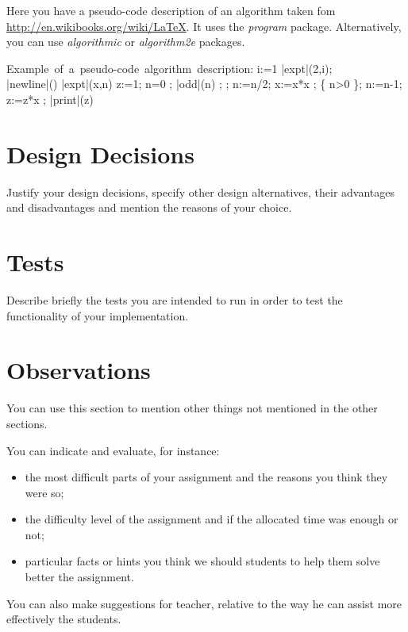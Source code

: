 Here you have a pseudo-code description of an algorithm taken fom \\ \href{http://en.wikibooks.org/wiki/LaTeX/Algorithms\_and\_Pseudocode\#Typesetting\_using\_the\_program\_package}{http://en.wikibooks.org/wiki/LaTeX}. It uses the \textit{program} package. Alternatively, you can use \textit{algorithmic} or \textit{algorithm2e} packages. 

\begin{program}
\mbox{Example of a pseudo-code algorithm description:}
\BEGIN %
  \FOR i:=1   \DO
     |expt|(2,i); \\ |newline|() \OD %
\WHERE
\PROC |expt|(x,n) \BODY
          z:=1;
          \DO \IF n=0 \THEN \EXIT \FI;
             \DO \IF |odd|(n) \THEN \EXIT \FI;
;
                n:=n/2; x:=x*x \OD;
             \{ n>0 \};
             n:=n-1; z:=z*x \OD;
          |print|(z) \ENDPROC
\END
\end{program}


\section{Design Decisions}

Justify your design decisions, specify other design alternatives, their advantages and disadvantages and mention the reasons of your choice.  

\section{Tests}

Describe briefly the tests you are intended to run in order to test the functionality of your implementation.

\section{Observations}

You can use this section to mention other things not mentioned in the other sections. 

You can indicate and evaluate, for instance:
\begin{itemize}
	\item the most difficult parts of your assignment and the reasons you think they were so; 
	
	\item the difficulty level of the assignment and if the allocated time was enough or not; 

	\item particular facts or hints you think we should students to help them solve better the assignment.

\end{itemize}

You can also make suggestions for teacher, relative to the way he can assist more effectively the students.
